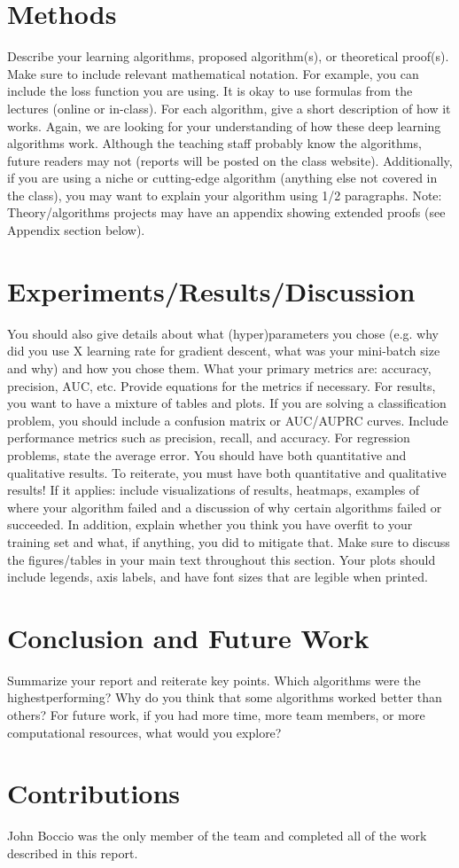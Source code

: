 \documentclass{article}
\begin{document}
\section{ Methods }
Describe your learning algorithms, proposed algorithm(s), or theoretical proof(s). Make
sure to include relevant mathematical notation. For example, you can include the loss function you are using. It is okay to use formulas from the lectures (online or in-class). For each algorithm, give a short description 
of how it works. Again, we are looking for your understanding of how these deep
learning algorithms work. Although the teaching staff probably know the algorithms, future
readers may not (reports will be posted on the class website). Additionally, if you are
using a niche or cutting-edge algorithm (anything else not covered in the class), you may want to explain your algorithm using 1/2
paragraphs. Note: Theory/algorithms projects may have an appendix showing extended
proofs (see Appendix section below).

\section{Experiments/Results/Discussion}
You should also give details about what (hyper)parameters you chose (e.g. why did you
use X learning rate for gradient descent, what was your mini-batch size and why) and how
you chose them. What your primary metrics are: accuracy, precision,
AUC, etc. Provide equations for the metrics if necessary. For results, you want to have a
mixture of tables and plots. If you are solving a classification problem, you should include a
confusion matrix or AUC/AUPRC curves. Include performance metrics such as precision,
recall, and accuracy. For regression problems, state the average error. You should have
both quantitative and qualitative results. To reiterate, you must have both quantitative
and qualitative results! If it applies: include visualizations of results, heatmaps,
examples of where your algorithm failed and a discussion of why certain algorithms failed
or succeeded. In addition, explain whether you think you have overfit to your training set
and what, if anything, you did to mitigate that. Make sure to discuss the figures/tables in
your main text throughout this section. Your plots should include legends, axis labels, and
have font sizes that are legible when printed.

\section{Conclusion and Future Work}
Summarize your report and reiterate key points. Which algorithms were the highestperforming?
Why do you think that some algorithms worked better than others? For
future work, if you had more time, more team members, or more computational resources,
what would you explore?

\section{Contributions}
John Boccio was the only member of the team and completed all of the work described in this report.



\end{document}
